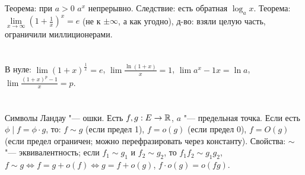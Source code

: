 \section{} %
Теорема: при $a>0$ $a^x$ непрерывно. Следствие: есть обратная $\log_a x$.
Теорема: $\lim\limits_{x \to \infty} \left(1+\frac 1x\right)^x = e$ (не к $\pm\infty$, а как угодно),
д-во: взяли целую часть, ограничили миллиционерами.

\section{} %
В нуле: $\lim (1+x)^{\frac 1 x} = e$, $\lim \frac{\ln(1+x)}{x} = 1$, $\lim {a^x-1}{x} = \ln a$, $\lim \frac{(1+x)^p-1}{x} = p$.

\section{} %
Символы Ландау "--- ошки.
Есть $f, g : E \to \mathbb{R}$, $a$ "--- предельная точка. Если есть $\phi \mid f=\phi\cdot g$, то:
$f \sim g$ (если предел 1), $f=o(g)$ (если предел 0), $f=O(g)$ (если предел ограничен; можно перефразировать
через константу). Свойства: $\sim$ "--- эквивалентность; если $f_1\sim g_1$ и $f_2\sim g_2$, то $f_1f_2 \sim g_1g_2$,
$f\sim g \iff f=g+o(f) \iff g=f+o(g)$, $f\cdot o(g) = o(fg)$. 
